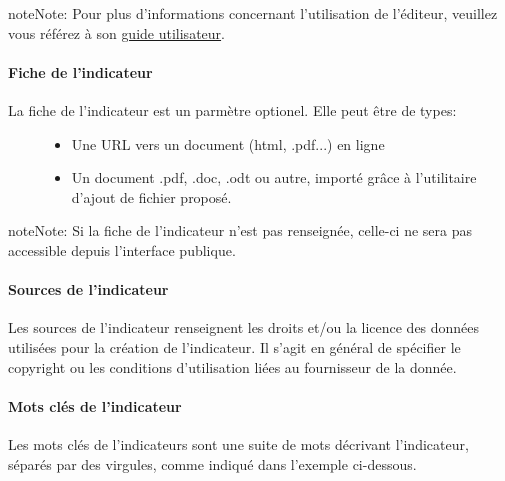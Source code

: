 \documentclass[letterpaper,10pt,french]{sphinxmanual}
\begin{document}
\begin{notice}{note}{Note:}
Pour plus d'informations concernant l'utilisation de l'éditeur, veuillez vous référez à son \href{http://docs.cksource.com/CKEditor\_3.x/Users\_Guide}{guide utilisateur}.
\end{notice}


\paragraph{Fiche de l'indicateur}
\label{indicators/indicatorspanel:fiche-de-l-indicateur}\begin{description}
\item[{La fiche de l'indicateur est un parmètre optionel. Elle peut être de types:}] \leavevmode\begin{itemize}
\item {} 
Une URL vers un document (html, .pdf...) en ligne

\item {} 
Un document .pdf, .doc, .odt ou autre, importé grâce à l'utilitaire d'ajout de fichier proposé.

\end{itemize}

\end{description}

\begin{notice}{note}{Note:}
Si la fiche de l'indicateur n'est pas renseignée, celle-ci ne sera pas accessible depuis l'interface publique.
\end{notice}


\paragraph{Sources de l'indicateur}
\label{indicators/indicatorspanel:sources-de-l-indicateur}
Les sources de l'indicateur renseignent les droits et/ou la licence des données utilisées pour la création de l'indicateur. Il s'agit en général de spécifier le copyright ou les conditions d'utilisation liées au fournisseur de la donnée.


\paragraph{Mots clés de l'indicateur}
\label{indicators/indicatorspanel:mots-cles-de-l-indicateur}
Les mots clés de l'indicateurs sont une suite de mots décrivant l'indicateur, séparés par des virgules, comme indiqué dans l'exemple ci-dessous.
\end{document}
